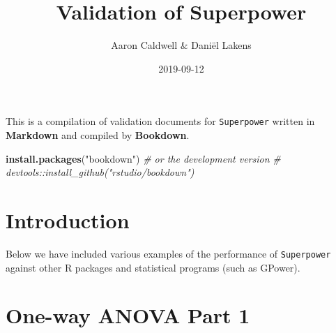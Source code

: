 \documentclass[]{book}
\title{Validation of Superpower}
\author{Aaron Caldwell \& Daniël Lakens}
\date{2019-09-12}
\newenvironment{Shaded}{\begin{snugshade}}{\end{snugshade}}
\newcommand{\CommentTok}[1]{\textcolor[rgb]{0.56,0.35,0.01}{\textit{#1}}}
\newcommand{\DataTypeTok}[1]{\textcolor[rgb]{0.13,0.29,0.53}{#1}}
\newcommand{\DecValTok}[1]{\textcolor[rgb]{0.00,0.00,0.81}{#1}}
\newcommand{\KeywordTok}[1]{\textcolor[rgb]{0.13,0.29,0.53}{\textbf{#1}}}
\newcommand{\NormalTok}[1]{#1}
\newcommand{\OperatorTok}[1]{\textcolor[rgb]{0.81,0.36,0.00}{\textbf{#1}}}
\newcommand{\OtherTok}[1]{\textcolor[rgb]{0.56,0.35,0.01}{#1}}
\newcommand{\StringTok}[1]{\textcolor[rgb]{0.31,0.60,0.02}{#1}}
\begin{document}
\maketitle

{
\setcounter{tocdepth}{1}
\tableofcontents
}
This is a compilation of validation documents for \texttt{Superpower} written in \textbf{Markdown} and compiled by \textbf{Bookdown}.

\begin{Shaded}
\begin{Highlighting}[]
\KeywordTok{install.packages}\NormalTok{(}\StringTok{"bookdown"}\NormalTok{)}
\CommentTok{# or the development version}
\CommentTok{# devtools::install_github("rstudio/bookdown")}
\end{Highlighting}
\end{Shaded}

\hypertarget{introduction}{%
\chapter{Introduction}\label{introduction}}

Below we have included various examples of the performance of \texttt{Superpower} against other R packages and statistical programs (such as GPower).

\hypertarget{intro}{%
\chapter{One-way ANOVA Part 1}\label{intro}}

\begin{Shaded}
\end{Shaded}
\end{document}
